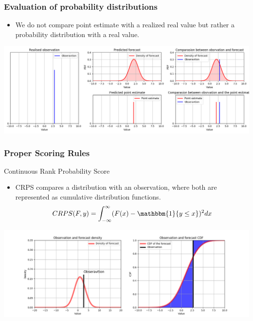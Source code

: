 \documentclass[18pt]{beamer}
\begin{document}
\begin{frame}
  \frametitle{Evaluation of probability distributions}
  \begin{itemize}
  \item We do not compare point estimate with a realized real value but rather a probability distribution with a real value.
  \end{itemize}
  \begin{center}
    \includegraphics[width=.99\textwidth, height=0.5\textwidth]{images/distribution_point}
  \end{center}
\end{frame}

\begin{frame}
  \frametitle{Proper Scoring Rules}

  Continuous Rank Probability Score
  \begin{itemize}
  \item CRPS compares a distribution with an observation, where both are represented as cumulative distribution functions.
    $$  CRPS(F,y)  = \int_{-\infty}^{\infty}(F(x) - \mathbbm{1}\{y \leq x \})^2dx $$
  \end{itemize}
  \includegraphics[scale=0.35]{images/crps}
\end{frame}
\end{document}
